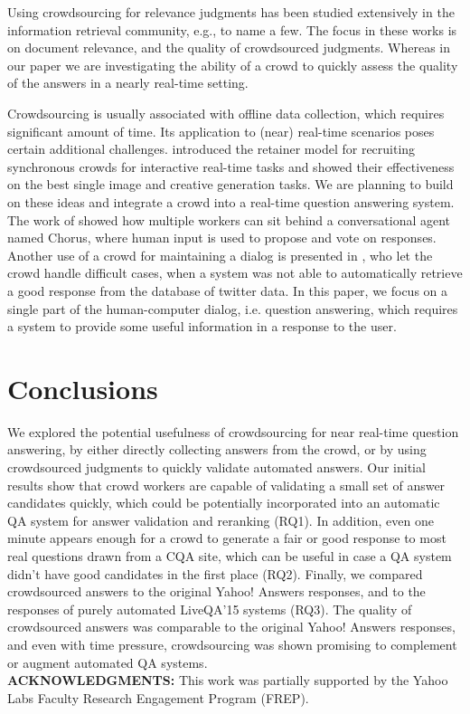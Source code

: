 \documentclass[11pt,letterpaper]{article}
\begin{document}
Using crowdsourcing for relevance judgments has been studied extensively in the information retrieval community, e.g., \cite{Alonso:2008:CRE:1480506.1480508,alonso2011design,grady2010crowdsourcing} to name a few.
The focus in these works is on document relevance, and the quality of crowdsourced judgments.
Whereas in our paper we are investigating the ability of a crowd to quickly assess the quality of the answers in a nearly real-time setting.

Crowdsourcing is usually associated with offline data collection, which requires significant amount of time.
Its application to (near) real-time scenarios poses certain additional challenges.
 introduced the retainer model for recruiting synchronous crowds for interactive real-time tasks and showed their effectiveness on the best single image and creative generation tasks.
We are planning to build on these ideas and integrate a crowd into a real-time question answering system.
The work of  showed how multiple workers can sit behind a conversational agent named Chorus, where human input is used to propose and vote on responses. 
Another use of a crowd for maintaining a dialog is presented in , who let the crowd handle difficult cases, when a system was not able to automatically retrieve a good response from the database of twitter data.
In this paper, we focus on a single part of the human-computer dialog, i.e. question answering, which requires a system to provide some useful information in a response to the user.


\section{Conclusions}
\label{sec:conclusion}

We explored the potential usefulness of crowdsourcing for near real-time question answering, by either directly collecting answers from the crowd, or by using crowdsourced judgments to quickly validate automated answers.
Our initial results show that crowd workers are capable of validating a small set of answer candidates quickly, which could be potentially incorporated into an automatic QA system for answer validation and reranking (RQ1).
In addition, even one minute appears enough for a crowd to generate a fair or good response to most real questions drawn from a CQA site, which can be useful in case a QA system didn't have good candidates in the first place (RQ2).
Finally, we compared crowdsourced answers to the original Yahoo! Answers responses, and to the responses of purely automated LiveQA'15 systems (RQ3).
The quality of crowdsourced answers was comparable to the original Yahoo! Answers responses, and even with time pressure, crowdsourcing was shown promising to complement or augment automated QA systems.\\

\noindent\textbf{ACKNOWLEDGMENTS:} This work was partially supported by the Yahoo Labs Faculty Research Engagement Program (FREP).




\end{document}
